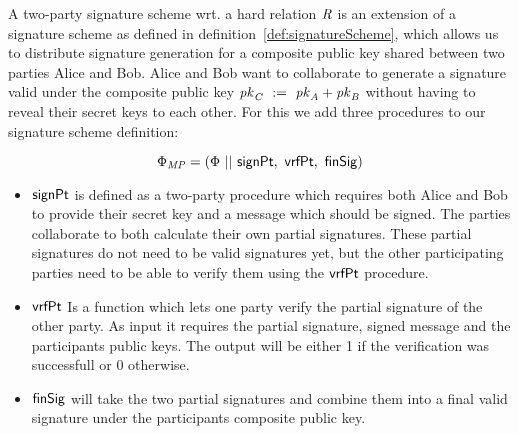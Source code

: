\begin{definition}
    \label{def:twoPartySig}
    A two-party signature scheme wrt. a hard relation $\mathit{R}$ is an extension of a signature scheme as defined in definition~\ref{def:signatureScheme}, which allows us to distribute signature generation for a composite public key shared between two parties Alice and Bob.
    Alice and Bob want to collaborate to generate a signature valid under the composite public key $\mathit{pk}_{\mathit{C}} ~:=~ \mathit{pk}_{\mathit{A}} + \mathit{pk}_{\mathit{B}}$ without having to reveal their secret keys to each other. For this we add three procedures to our signature scheme definition:

    \[ \Phi_{\mathit{MP}} = (\Phi ~||~ \mathsf{signPt} ,~ \mathsf{vrfPt} ,~ \mathsf{finSig}) \]
    
    \begin{itemize}
        \item $\mathsf{signPt}$ is defined as a two-party procedure which requires both Alice and Bob to provide their secret key and a message which should be signed. The parties collaborate to both calculate their own partial signatures. These partial signatures do not need to be valid signatures yet, but the other participating parties need to be able to verify them using the $\mathsf{vrfPt}$ procedure.
        \item $\mathsf{vrfPt}$ Is a function which lets one party verify the partial signature of the other party. As input it requires the partial signature, signed message and the participants public keys. The output will be either 1 if the verification was successfull or 0 otherwise.
        \item $\mathsf{finSig}$ will take the two partial signatures and combine them into a final valid signature under the participants composite public key.
    \end{itemize}
\end{definition}

